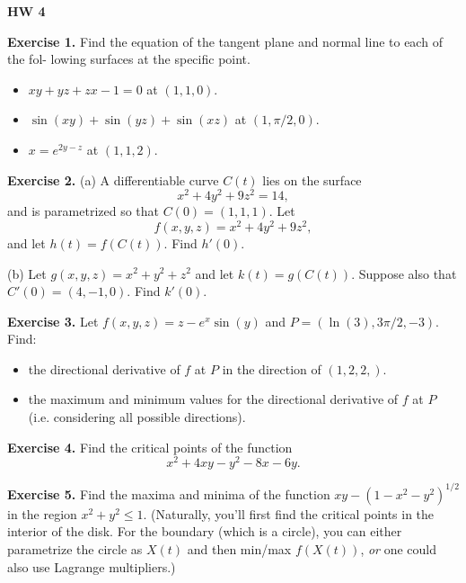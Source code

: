 \documentclass{article}
\begin{document}

\textbf{HW 4}

\textbf{Exercise 1.} Find the equation of the tangent plane and normal line to each of the fol-
lowing surfaces at the specific point.
\begin{itemize}
    \item $xy+yz+zx-1=0$ at $(1,1,0)$.
    \item $\sin(xy) + \sin(yz) + \sin(xz)$ at $(1,\pi/2,0)$.
    \item $x=e^{2y-z}$ at $(1,1,2)$.
\end{itemize}

\textbf{Exercise 2.} 
(a) A differentiable curve $C(t)$ lies on the surface
\[x^2 + 4y^2 + 9z^2 = 14,\]
and is parametrized so that $C(0) = (1,1,1)$. Let 
\[f(x,y,z) = x^2 + 4y^2 + 9z^2,\]
and let $h(t) = f(C(t))$. Find $h'(0)$.

(b) Let $g(x,y,z) = x^2 + y^2 + z^2$ and let $k(t) = g(C(t))$.
Suppose also that $C'(0)=(4,-1,0)$. Find $k'(0)$.

\textbf{Exercise 3.} 
Let $f(x,y,z) = z - e^x \sin(y)$ and $P=(\ln(3), 3\pi/2, -3)$.
Find:
\begin{itemize}
    \item the directional derivative of $f$ at $P$ in the direction of $(1,2,2,)$.
    \item the maximum and minimum values for the directional derivative of $f$ at $P$ (i.e. considering all possible directions).
\end{itemize}

\textbf{Exercise 4.} 
Find the critical points of the function
\[x^2+4xy-y^2-8x-6y.\]

\textbf{Exercise 5.}
Find the maxima and minima of the function $xy - (1-x^2-y^2)^{1/2}$ in the region
$x^2+y^2 \leq 1$. (Naturally, you'll first find the critical points 
in the interior of the disk. For the boundary (which is a circle), you can either parametrize
the circle as $X(t)$ and then min/max $f(X(t))$, \emph{or} one could also
use Lagrange multipliers.)
\end{document}
